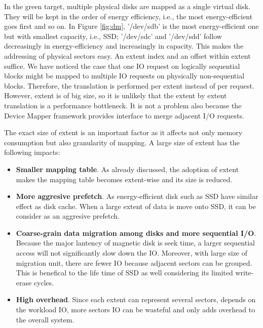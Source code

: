 In the green target, multiple physical disks are mapped as a single
virtual disk. They will be kept in the order of energy efficiency,
i.e., the most energy-efficient goes first and so on. In Figure
\ref{fig:dm}, '/dev/sdb' is the most energy-efficient one but with
smallest capacity, i.e., SSD; '/dev/sdc' and '/dev/sdd' follow
decreasingly in energy-efficiency and increasingly in capacity. This
makes the addressing of physical sectors easy. An extent index and an
offset within extent suffice. We have noticed the case that one IO
request on logically sequential blocks might be mapped to multiple IO
requests on physically non-sequential blocks. Therefore, the
translation is performed per extent instead of per request. However,
extent is of big size, so it is unlikely that the extent by extent
translation is a performance bottleneck. It is not a problem also
because the Device Mapper framework provides interface to merge
adjacent I/O requests. 

The exact size of extent is an important factor as it affects not only
memory consumption but also granularity of mapping. A large size of
extent has the following impacts: 

\begin{itemize} 
\item \textbf{Smaller mapping table}. As already discussed, the
adoption of extent makes the mapping table becomes extent-wise and its
size is reduced. 

\item \textbf{More aggresive prefetch}. As energy-efficient disk such
as SSD have similar effect as disk cache. When a large extent of data
is move onto SSD, it can be consider as an aggresive prefetch. 

\item \textbf{Coarse-grain data migration among disks and more
sequential I/O}. Because the major lantency of magnetic disk is seek
time, a larger sequential access will not significantly slow down the
IO. Moreover, with large size of migration unit, there are fewer IO
because adjacent sectors can be grouped. This is benefical to the life
time of SSD as well considering its limited write-erase cycles.

\item \textbf{High overhead}. Since each extent can represent several
sectors, depends on the workload IO, more sectors IO can be wasteful
and only adds overhead to the overall system. 

\end{itemize}

